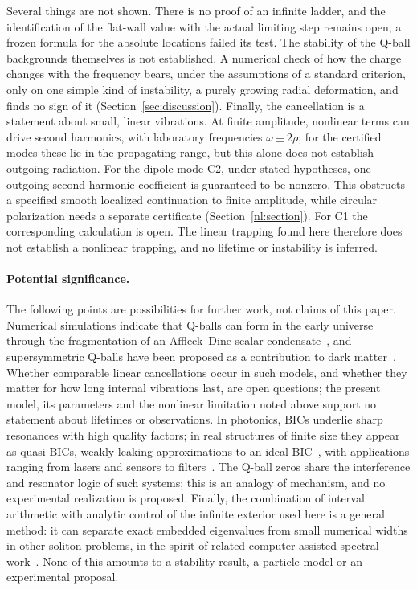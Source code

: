 Several things are not shown. There is no proof of an infinite
ladder, and the identification of the flat-wall value with the actual
limiting step remains open; a frozen formula for the absolute locations
failed its test. The stability of the Q-ball backgrounds themselves is
not established. A numerical check of how the charge changes with the
frequency bears, under the assumptions of a standard criterion, only on
one simple kind of instability, a purely growing radial deformation, and
finds no sign of it (Section~\ref{sec:discussion}). Finally, the cancellation is a statement about small,
linear vibrations. At finite amplitude, nonlinear terms can drive second
harmonics, with laboratory frequencies $\omega\pm2\rho$; for the
certified modes these lie in the propagating range, but this alone does
not establish outgoing radiation. For the dipole mode C2, under stated
hypotheses, one outgoing second-harmonic coefficient is guaranteed to be
nonzero. This obstructs a specified smooth localized continuation to
finite amplitude, while circular polarization needs a separate
certificate (Section~\ref{nl:section}). For C1 the corresponding
calculation is open. The linear trapping found here therefore does not
establish a nonlinear trapping, and no lifetime or instability is
inferred.

\paragraph{Potential significance.}
The following points are possibilities for further work, not claims of
this paper. Numerical simulations indicate that Q-balls can form in
the early universe through the fragmentation of an Affleck--Dine scalar
condensate~\cite{KasuyaKawasaki2000}, and supersymmetric Q-balls have
been proposed as a contribution to dark
matter~\cite{KusenkoShaposhnikov1998}. Whether comparable linear
cancellations occur in such models, and whether they matter for how
long internal vibrations last, are open questions; the present model,
its parameters and the nonlinear limitation noted above support no
statement about lifetimes or observations. In photonics, BICs underlie
sharp resonances with high quality factors; in real structures of
finite size they appear as quasi-BICs, weakly leaking approximations to
an ideal BIC~\cite{Koshelev2018}, with applications ranging from lasers
and sensors to filters~\cite{Hsu2016}. The Q-ball zeros share the
interference and resonator logic of such systems; this is an analogy of
mechanism, and no experimental realization is proposed. Finally, the
combination of interval arithmetic with analytic control of the
infinite exterior used here is a general method: it can separate exact
embedded eigenvalues from small numerical widths in other soliton
problems, in the spirit of related computer-assisted spectral
work~\cite{LuhrmannEtAl2026,MarzuolaSimpson2011}. None of this amounts
to a stability result, a particle model or an experimental proposal.

